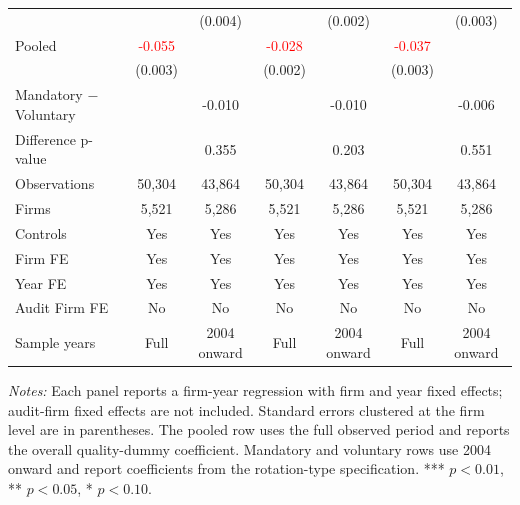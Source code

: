 \begin{table}[htbp]
\begin{threeparttable}
{\begin{tabular}{l cc cc cc}
 &  & (0.004) &  & (0.002) &  & (0.003) \\
Pooled & \textcolor{red}{-0.055\sym{***}} &  & \textcolor{red}{-0.028\sym{***}} &  & \textcolor{red}{-0.037\sym{***}} &  \\
 & (0.003) &  & (0.002) &  & (0.003) &  \\
Mandatory $-$ Voluntary &  & -0.010 &  & -0.010 &  & -0.006 \\
Difference p-value &  & 0.355 &  & 0.203 &  & 0.551 \\
Observations & 50,304 & 43,864 & 50,304 & 43,864 & 50,304 & 43,864 \\
Firms & 5,521 & 5,286 & 5,521 & 5,286 & 5,521 & 5,286 \\
\midrule
Controls & Yes & Yes & Yes & Yes & Yes & Yes \\
Firm FE & Yes & Yes & Yes & Yes & Yes & Yes \\
Year FE & Yes & Yes & Yes & Yes & Yes & Yes \\
Audit Firm FE & No & No & No & No & No & No \\
Sample years & Full & 2004 onward & Full & 2004 onward & Full & 2004 onward \\
\bottomrule
\end{tabular}}
\begin{tablenotes}\footnotesize
\item \textit{Notes:} Each panel reports a firm-year regression with firm and year fixed effects; audit-firm fixed effects are not included. Standard errors clustered at the firm level are in parentheses. The pooled row uses the full observed period and reports the overall quality-dummy coefficient. Mandatory and voluntary rows use 2004 onward and report coefficients from the rotation-type specification. *** \(p<0.01\), ** \(p<0.05\), * \(p<0.10\).
\end{tablenotes}
\end{threeparttable}
\end{table}

